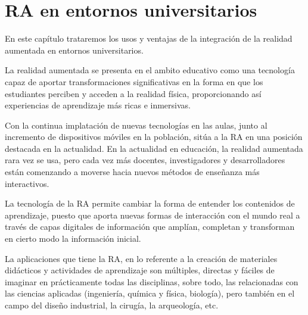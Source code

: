 %
%
%
%

\chapter{RA en entornos universitarios } \label{chap:RAEntornosUniversitarios}  

En este capítulo trataremos los usos y ventajas de la integración de la realidad aumentada en entornos universitarios.

La realidad aumentada se presenta en el ambito educativo como una tecnología capaz de aportar transformaciones significativas en la forma en que los estudiantes perciben y acceden a la realidad física, proporcionando así experiencias de aprendizaje más ricas e inmersivas.

Con la continua implatación de nuevas tecnologías en las aulas, junto al incremento de dispositivos móviles en la población, sitúa a la RA en una posición destacada en la actualidad. En la actualidad en educación, la realidad aumentada rara vez se usa, pero cada vez más docentes, investigadores y desarrolladores están comenzando a moverse hacia nuevos métodos de enseñanza más interactivos.


La tecnología de la RA permite cambiar la forma de entender los contenidos de aprendizaje, puesto que aporta nuevas formas de interacción con el mundo real a través de capas digitales de información que amplían, completan y transforman en cierto modo la información inicial.

La aplicaciones que tiene la RA, en lo referente a la creación de materiales didácticos y actividades de aprendizaje son múltiples, directas y fáciles de imaginar en prácticamente todas las disciplinas, sobre todo, las relacionadas con las ciencias aplicadas (ingeniería, química y física, biología), pero también en el campo del diseño industrial, la cirugía, la arqueología, etc.


